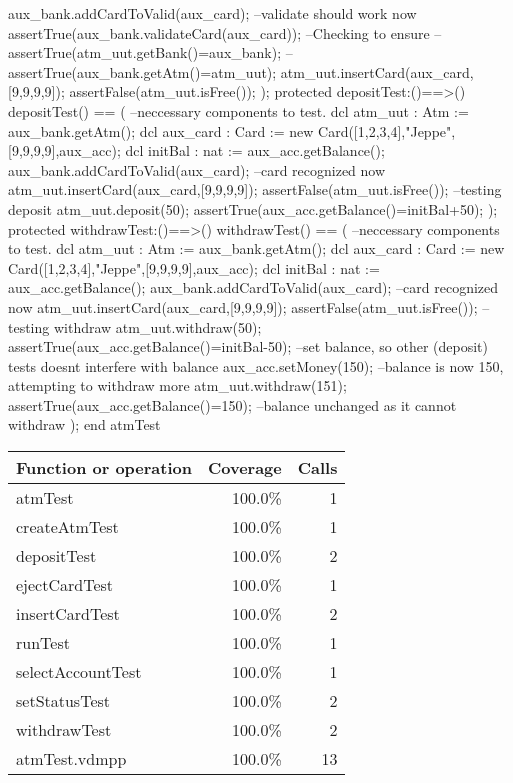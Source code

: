 \documentclass[a4paper]{article}
\begin{document}
\begin{vdm_al}
        aux_bank.addCardToValid(aux_card); --validate should work now
        assertTrue(aux_bank.validateCard(aux_card)); --Checking to ensure
        --assertTrue(atm_uut.getBank()=aux_bank);
        --assertTrue(aux_bank.getAtm()=atm_uut);
        atm_uut.insertCard(aux_card,[9,9,9,9]);
        assertFalse(atm_uut.isFree()); 
    );
    protected depositTest:()==>()
    depositTest() == (
        --neccessary components to test.
        dcl atm_uut : Atm := aux_bank.getAtm();
        dcl aux_card : Card := new Card([1,2,3,4],"Jeppe",[9,9,9,9],aux_acc);
        dcl initBal : nat := aux_acc.getBalance();
        aux_bank.addCardToValid(aux_card); --card recognized now
        atm_uut.insertCard(aux_card,[9,9,9,9]);
        assertFalse(atm_uut.isFree());
        --testing deposit
        atm_uut.deposit(50);
        assertTrue(aux_acc.getBalance()=initBal+50);
    );
    protected withdrawTest:()==>()
    withdrawTest() == (
        --neccessary components to test.
        dcl atm_uut : Atm := aux_bank.getAtm();
        dcl aux_card : Card := new Card([1,2,3,4],"Jeppe",[9,9,9,9],aux_acc);
        dcl initBal : nat := aux_acc.getBalance();
        aux_bank.addCardToValid(aux_card); --card recognized now
        atm_uut.insertCard(aux_card,[9,9,9,9]);
        assertFalse(atm_uut.isFree());
        --testing withdraw
        atm_uut.withdraw(50);
        assertTrue(aux_acc.getBalance()=initBal-50);
        --set balance, so other (deposit) tests doesnt interfere with balance
        aux_acc.setMoney(150);
        --balance is now 150, attempting to withdraw more
        atm_uut.withdraw(151);
        assertTrue(aux_acc.getBalance()=150); --balance unchanged as it cannot withdraw
    );
end atmTest
\end{vdm_al}
\bigskip
\begin{longtable}{|l|r|r|}
\hline
Function or operation & Coverage & Calls \\
\hline
\hline
atmTest & 100.0\% & 1 \\
\hline
createAtmTest & 100.0\% & 1 \\
\hline
depositTest & 100.0\% & 2 \\
\hline
ejectCardTest & 100.0\% & 1 \\
\hline
insertCardTest & 100.0\% & 2 \\
\hline
runTest & 100.0\% & 1 \\
\hline
selectAccountTest & 100.0\% & 1 \\
\hline
setStatusTest & 100.0\% & 2 \\
\hline
withdrawTest & 100.0\% & 2 \\
\hline
\hline
atmTest.vdmpp & 100.0\% & 13 \\
\hline
\end{longtable}
\end{document}
